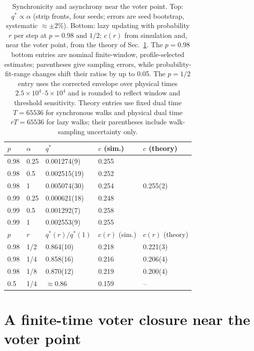 \documentclass[pre,twocolumn,superscriptaddress,showpacs,floatfix]{revtex4-2}
\newcommand{\qs}{q^{*}}
\begin{document}
\begin{table}
\caption{Synchronicity and asynchrony near the voter point. Top: $\qs\propto\alpha$ (strip
fronts, four seeds; errors are seed bootstrap, systematic $\approx\pm2\%$). Bottom: lazy updating
with probability $r$ per step at $p = 0.98$ and $1/2$; $c(r)$ from simulation and, near the voter
point, from the theory of Sec.~\ref{sec:theory}. The $p=0.98$ bottom entries
are nominal finite-window, profile-selected estimates; parentheses give
sampling errors, while probability-fit-range changes shift their ratios
by up to 0.05. The $p=1/2$ entry uses the corrected envelope over physical
times $2.5\times10^4$--$5\times10^4$ and is rounded to reflect window and
threshold sensitivity. Theory entries use fixed dual time $T=65536$
for synchronous walks and physical dual time $rT=65536$ for lazy walks;
their parentheses include walk-sampling uncertainty only.}
\label{tab:alpha}
\begin{ruledtabular}
\begin{tabular}{lllll}
$p$ & $\alpha$ & $\qs$ & $c$ (sim.) & $c$ (theory) \\
\hline
0.98 & 0.25 & 0.001274(9) & 0.255 & \\
0.98 & 0.5 & 0.002515(19) & 0.252 & \\
0.98 & 1 & 0.005074(30) & 0.254 & 0.255(2) \\
0.99 & 0.25 & 0.000621(18) & 0.248 & \\
0.99 & 0.5 & 0.001292(7) & 0.258 & \\
0.99 & 1 & 0.002553(9) & 0.255 & \\
\hline
$p$ & $r$ & $\qs(r)/\qs(1)$ & $c(r)$ (sim.) & $c(r)$ (theory) \\
\hline
0.98 & 1/2 & 0.864(10) & 0.218 & 0.221(3) \\
0.98 & 1/4 & 0.858(16) & 0.216 & 0.206(4) \\
0.98 & 1/8 & 0.870(12) & 0.219 & 0.200(4) \\
0.5 & 1/4 & $\approx0.86$ & 0.159 & -- \\
\end{tabular}
\end{ruledtabular}
\end{table}

\section{A finite-time voter closure near the voter point}
\label{sec:theory}
\end{document}
